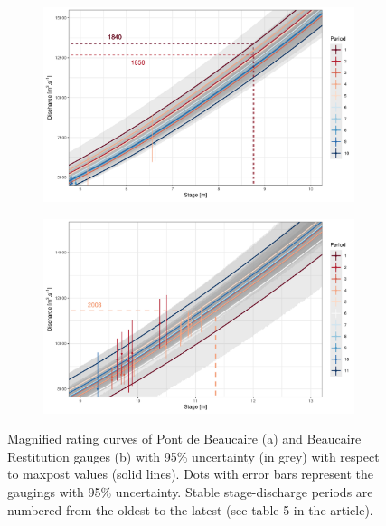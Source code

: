 \documentclass[11pt]{article}
\begin{document}
	
	\begin{figure}
		\centering
		\begin{subfigure}{.8\textwidth}
            \centering
            \includegraphics[width=\linewidth]{Supplementary/RC_Pt_zoom.pdf}
            \caption{}
            \label{subfig:RcPtZoom}
        \end{subfigure}
        \begin{subfigure}{0.8\textwidth}	
            \centering
            \includegraphics[width=\linewidth]{Supplementary/RC_Res_zoom.pdf}
            \caption{}
            \label{subfig:RcResZoom}
        \end{subfigure}
        \caption{Magnified rating curves of Pont de Beaucaire (a) and Beaucaire Restitution gauges (b) with 95\% uncertainty (in grey) with respect to maxpost values (solid lines). Dots with error bars represent the gaugings with 95\% uncertainty. Stable stage-discharge periods are numbered from the oldest to the latest (see table 5 in the article).}
	\end{figure}
	
\end{document}
